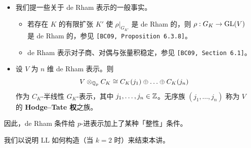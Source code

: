 \begin{itemize}
\item 我们提一些关于 de Rham 表示的一般事实。
\begin{itemize}
\item 若存在 $K$ 的有限扩张 $K'$ 使 $\rho|_{G_{K'}}$ 是 de Rham 的，则 $\rho:G_K\to\operatorname{GL}(V)$ 是 de Rham 的，参见 \texttt{[BC09, Proposition 6.3.8]}。
\item de Rham 表示对子商、对偶与张量积稳定，参见 \texttt{[BC09, Section 6.1]}。
\end{itemize}
\item 设 $V$ 为 $n$ 维 de Rham 表示。则
\[
V\otimes_{\mathbb{Q}_p}C_K\cong C_K(j_1)\oplus\ldots\oplus C_K(j_n)
\]
作为 $C_K$-半线性 $G_K$-表示，其中 $j_1,\dots,j_n\in\mathbb{Z}$。无序族 $(j_1,\dots,j_n)$ 称为 $V$ 的 \textbf{Hodge--Tate 权}之族。
\end{itemize}

因此，de Rham 条件给 $p$-进表示加上了某种「整性」条件。

我们以说明 $\mathrm{LL}$ 如何构造（当 $k=2$ 时）来结束本讲。

